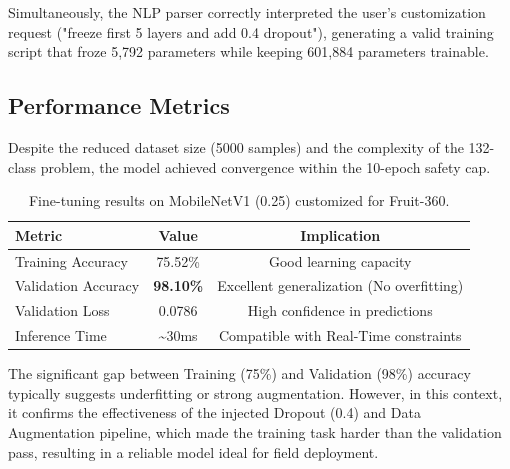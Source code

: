 Simultaneously, the NLP parser correctly interpreted the user's customization request ("freeze first 5 layers and add 0.4 dropout"), generating a valid training script that froze 5,792 parameters while keeping 601,884 parameters trainable.

\subsection{Performance Metrics}
Despite the reduced dataset size (5000 samples) and the complexity of the 132-class problem, the model achieved convergence within the 10-epoch safety cap.

\begin{table}[h]
    \centering
    \begin{tabular}{|l|c|c|}
        \hline
        \textbf{Metric}     & \textbf{Value}      & \textbf{Implication}                      \\
        \hline
        Training Accuracy   & 75.52\%             & Good learning capacity                    \\
        \hline
        Validation Accuracy & \textbf{98.10\%}    & Excellent generalization (No overfitting) \\
        \hline
        Validation Loss     & 0.0786              & High confidence in predictions            \\
        \hline
        Inference Time      & \textasciitilde30ms & Compatible with Real-Time constraints     \\
        \hline
    \end{tabular}
    \caption{Fine-tuning results on MobileNetV1 (0.25) customized for Fruit-360.}
    \label{tab:finetuning_results}
\end{table}

The significant gap between Training (75\%) and Validation (98\%) accuracy typically suggests underfitting or strong augmentation. However, in this context, it confirms the effectiveness of the injected Dropout (0.4) and Data Augmentation pipeline, which made the training task harder than the validation pass, resulting in a reliable model ideal for field deployment.
